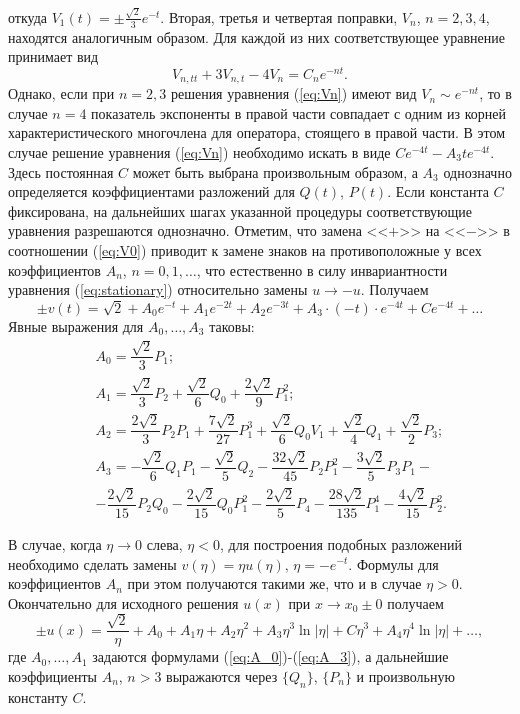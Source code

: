 %
откуда $V_1(t) = \pm \frac{\sqrt{2}}{3} e^{-t}$.
Вторая, третья и четвертая поправки, $V_n$, $n = 2,3,4$, находятся аналогичным образом.
Для каждой из них соответствующее уравнение принимает вид
%
\begin{equation}
V_{n,tt} + 3V_{n,t} - 4V_n = C_n e^{-nt}.
\label{eq:Vn}
\end{equation}
%
Однако, если при $n = 2,3$ решения уравнения (\ref{eq:Vn}) имеют вид $V_n \sim e^{-nt}$, то в случае $n = 4$ показатель экспоненты в правой части совпадает с одним из корней характеристического многочлена для оператора, стоящего в правой части.
В этом случае решение уравнения (\ref{eq:Vn}) необходимо искать в виде $Ce^{-4t} - A_3 t e^{-4t}$.
Здесь постоянная $C$ может быть выбрана произвольным образом, а $A_3$ однозначно определяется коэффициентами разложений для $Q(t)$, $P(t)$.
Если константа $C$ фиксирована, на дальнейших шагах указанной процедуры соответствующие уравнения разрешаются однозначно.
Отметим, что замена <<$+$>> на <<$-$>> в соотношении (\ref{eq:V0}) приводит к замене знаков на противоположные у всех коэффициентов $A_n$, $n = 0, 1, \dots$, что естественно в силу инвариантности уравнения (\ref{eq:stationary}) относительно замены $u \to -u$.
Получаем
%
\begin{equation}
\pm v(t) = \sqrt{2} + A_0 e^{-t} + A_1 e^{-2t} + A_2 e^{-3t} + A_3 \cdot (-t) \cdot e^{-4t} + Ce^{-4t} + \dots
\end{equation}
%
Явные выражения для $A_0, \dots, A_3$ таковы:
%
\begin{eqnarray}
&& A_0 = \dfrac{\sqrt{2}}{3} P_1; \label{eq:A_0} \\
&& A_1 = \dfrac{\sqrt{2}}{3} P_2 + \dfrac{\sqrt{2}}{6} Q_0 + \dfrac{2\sqrt{2}}{9} P_1^2; \label{eq:A_1} \\
&& A_2 = \dfrac{2\sqrt{2}}{3} P_2 P_1 + \dfrac{7\sqrt{2}}{27} P_1^3 + \dfrac{\sqrt{2}}{6} Q_0 V_1 + \dfrac{\sqrt{2}}{4} Q_1 + \dfrac{\sqrt{2}}{2} P_3; \label{eq:A_2} \\
&& A_3 = -\dfrac{\sqrt{2}}{6} Q_1 P_1 - \dfrac{\sqrt{2}}{5} Q_2 - \dfrac{32 \sqrt{2}}{45} P_2 P_1^2 - \dfrac{3\sqrt{2}}{5} P_3 P_1 - \label{eq:A_3} \\ 
&& \nonumber - \dfrac{2\sqrt{2}}{15} P_2 Q_0 - \dfrac{2\sqrt{2}}{15} Q_0 P_1^2 - \dfrac{2\sqrt{2}}{5} P_4 - \dfrac{28\sqrt{2}}{135} P_1^4 - \dfrac{4\sqrt{2}}{15} P_2^2.
\end{eqnarray}
%

В случае, когда $\eta \to 0$ слева, $\eta < 0$, для построения подобных разложений необходимо сделать замены $v(\eta) = \eta u(\eta)$, $\eta = -e^{-t}$.
Формулы для коэффициентов $A_n$ при этом получаются такими же, что и в случае $\eta > 0$.
Окончательно для исходного решения $u(x)$ при $x \to x_0 \pm 0$ получаем
%
\begin{equation}
\pm u(x) = \dfrac{\sqrt{2}}{\eta} + A_0 + A_1 \eta + A_2 \eta^2 + A_3 \eta^3 \ln|\eta| + C\eta^3 + A_4\eta^4 \ln|\eta| + \dots,
\label{eq:final_asympt}
\end{equation}
%
где $A_0,\dots,A_1$ задаются формулами (\ref{eq:A_0})-(\ref{eq:A_3}), а дальнейшие коэффициенты $A_n$, $n > 3$ выражаются через $\{ Q_n \}$, $\{ P_n \}$ и произвольную константу $C$.

